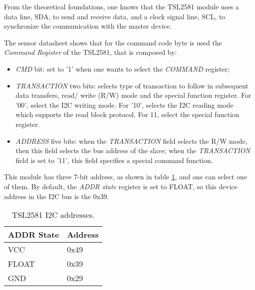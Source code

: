 From the theoretical foundations, one knows that the TSL2581 module uses a data line, SDA, to send and receive data, and a clock signal line, SCL, to synchronize the communication with the master device.

The sensor datasheet \cite{TSL2581_DS} shows that for the command code byte is used the \textit{Command Register} of the TSL2581, that is composed by:

\begin{itemize}
	\item \textit{CMD} bit: set to '1' when one wants to select the \textit{COMMAND} register;
	\item \textit{TRANSACTION} two bits: selects type of transaction to follow in subsequent data transfers, read/ write (R/W) mode and the special function register. For '00', select the I2C writing mode. For '10', selects the I2C reading mode which supports the read block protocol. For 11, select the special function register. 
	\item \textit{ADDRESS} five bits: when the \textit{TRANSACTION} field selects the R/W mode, then this field selects the bus address of the slave; when the \textit{TRANSACTION} field is set to '11', this field specifies a special command function.
\end{itemize}	


This module has three 7-bit address, as shown in table \ref{table:tsl_address}, and one can select one of them. By default, the \textit{ADDR state} register is set to FLOAT, so this device address in the I2C bus is the 0x39.

\begin{table}[H]
	\centering
	\begin{tabular}{|m{3cm}|m{3cm}|}
		\hline
		\textbf{ADDR State} & \textbf{Address}
		\\\hline\hline
		VCC & 0x49
		\\\hline
		FLOAT & 0x39
		\\\hline
		GND & 0x29
		\\\hline
	\end{tabular}
	
	\caption{TSL2581 I2C addresses.}
	\label{table:tsl_address}
\end{table}


